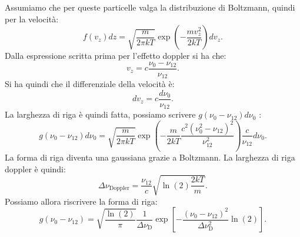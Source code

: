 Assumiamo che per queste particelle valga la distribuzione di Boltzmann, quindi per la velocità:
\[
    f(v_z) dz = 
    \sqrt{\frac{m}{2\pi kT}} \exp\left(- \frac{mv_z^2}{2kT}\right)dv_z
.\] 
Dalla espressione scritta prima per l'effetto doppler si ha che:
\[
    v_z = c \frac{\nu_0-\nu_{12}}{\nu_{12}}
.\] 
Si ha quindi che il differenziale della velocità è:
\[
    dv_z = c \frac{d\nu_0}{\nu_{12}}
.\] 
La larghezza di riga è quindi fatta, possiamo scrivere $g(\nu_0-\nu_{12})d\nu_0$ :
\[
    g(\nu_0-\nu_{12}) d\nu_0 = 
    \sqrt{\frac{m}{2\pi kT}}
    \exp\left(-\frac{m}{2kT}
    \frac{c^2\left(\nu_0^2-\nu_{12}\right)^2}{\nu_{12}^2}\right)
    \frac{c}{\nu_{12}}d\nu_0
.\] 
La forma di riga diventa una gaussiana grazie a Boltzmann. La larghezza di riga doppler è quindi:
\[
    \Delta\nu _\text{Doppler} = \frac{\nu_{12}}{c}\sqrt{\ln (2)  \frac{2kT}{m}}
.\] 
Possiamo allora riscrivere la forma di riga:
\[
    g(\nu_0-\nu_{12}) = \sqrt{\frac{\ln (2) }{\pi}}
    \frac{1}{\Delta\nu_\text{D} }
    \exp\left[- 
    \frac{\left(\nu_0-\nu_{12}\right)^2}{\Delta\nu_\text{D} ^2}\ln (2)
    \right]
.\]
